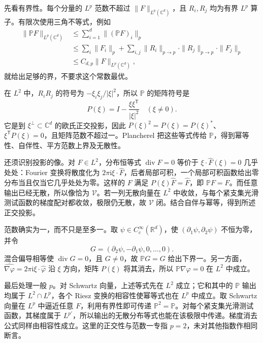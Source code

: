 \begin{solution}
先看有界性。每个分量的 \(L^p\) 范数不超过 \(\|F\|_{L^p(\mathbb C^d)}\)，且 \(R_i,R_j\) 均为有界 \(L^p\) 算子。有限次使用三角不等式，例如
\[
 \begin{aligned}
 \|\mathbb PF\|_{L^p(\mathbb C^d)}
 &\leq\sum_{i=1}^d\|(\mathbb PF)_i\|_p\\
 &\leq\sum_i\|F_i\|_p
   +\sum_{i,j}\|R_i\|_{p\to p}\cdot\|R_j\|_{p\to p}\cdot\|F_j\|_p\\
 &\leq C_{d,p}\|F\|_{L^p(\mathbb C^d)},
 \end{aligned}
\]
就给出足够的界，不要求这个常数最优。

在 \(L^2\) 中，\(R_iR_j\) 的符号为 \(-\xi_i\xi_j/|\xi|^2\)，所以 \(\mathbb P\) 的矩阵符号是
\[
 P(\xi)=I-\frac{\xi\xi^{\mathsf T}}{|\xi|^2}
 \quad(\xi\ne0).
\]
它是到 \(\xi^\perp\subset\mathbb C^d\) 的欧氏正交投影，因此
\(P(\xi)^2=P(\xi)=P(\xi)^*\)、\(\xi^{\mathsf T}P(\xi)=0\)，且矩阵范数不超过一。Plancherel 把这些等式传给 \(\mathbb P\)，得到幂等性、自伴性、平方范数上界及无散性。

还须识别投影的像。对 \(F\in L^2\)，分布恒等式 \(\operatorname{div}F=0\) 等价于
\(\xi\cdot\widehat F(\xi)=0\) 几乎处处：Fourier 变换将散度化为 \(2\pi\mathrm i\xi\cdot\widehat F\)，后者局部可积，一个局部可积函数给出零分布当且仅当它几乎处处为零。这样的 \(F\) 满足 \(P(\xi)\widehat F=\widehat F\)，即 \(\mathbb PF=F\)。而任意输出已经无散，所以像恰为 \(\mathcal V\)。若一列无散向量在 \(L^2\) 中收敛，与每个紧支集光滑测试函数的梯度配对都收敛，极限仍无散，故 \(\mathcal V\) 闭。结合自伴与幂等，得到所述正交投影。

范数确实为一，而不只是至多一。取 \(\psi\in C_c^\infty(\mathbb R^d)\)，使
\((\partial_1\psi,\partial_2\psi)\) 不恒为零，并令
\[
 G=(\partial_2\psi,-\partial_1\psi,0,\ldots,0).
\]
混合偏导相等使 \(\operatorname{div}G=0\)，且 \(G\ne0\)，故 \(\mathbb PG=G\) 给出下界一。另一方面，\(\widehat{\nabla\varphi}=2\pi\mathrm i\xi\cdot\widehat\varphi\) 沿 \(\xi\) 方向，矩阵 \(P(\xi)\) 将其消去，所以 \(\mathbb P\nabla\varphi=0\) 在 \(L^2\) 中成立。

最后处理一般 \(p\)。对 Schwartz 向量，上述等式先在 \(L^2\) 成立；它和其中的 \(\mathbb P\) 输出均属于 \(L^2\cap L^p\)，各个 Riesz 变换的相容性使幂等式也在 \(L^p\) 中成立。取 Schwartz 向量在 \(L^p\) 中逼近任意 \(F\)，利用有界性即可传递 \(\mathbb P^2=\mathbb P\)。对每个紧支集光滑测试函数，其梯度属于 \(L^{p'}\)，所以输出的无散分布等式也能在该极限中传递。梯度消去公式同样由相容性成立。这里的正交性与范数一专指 \(p=2\)，未对其他指数作相同断言。
\end{solution}

